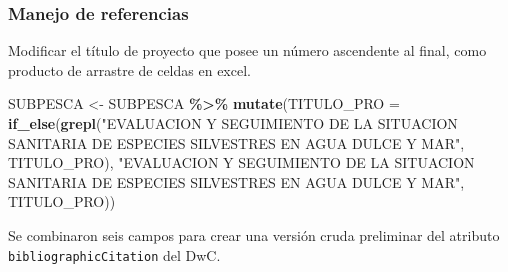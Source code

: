 \documentclass[sn-apa,pdflatex]{sn-jnl}
\newenvironment{Shaded}{\begin{snugshade}}{\end{snugshade}}
\newcommand{\AttributeTok}[1]{\textcolor[rgb]{0.13,0.29,0.53}{#1}}
\newcommand{\FunctionTok}[1]{\textcolor[rgb]{0.13,0.29,0.53}{\textbf{#1}}}
\newcommand{\NormalTok}[1]{#1}
\newcommand{\OtherTok}[1]{\textcolor[rgb]{0.56,0.35,0.01}{#1}}
\newcommand{\SpecialCharTok}[1]{\textcolor[rgb]{0.81,0.36,0.00}{\textbf{#1}}}
\newcommand{\StringTok}[1]{\textcolor[rgb]{0.31,0.60,0.02}{#1}}
\begin{document}
\subsubsection{Manejo de referencias}\label{manejo-de-referencias}

Modificar el título de proyecto que posee un número ascendente al final,
como producto de arrastre de celdas en excel.

\begin{Shaded}
\begin{Highlighting}[]
\NormalTok{SUBPESCA }\OtherTok{\textless{}{-}}\NormalTok{ SUBPESCA }\SpecialCharTok{\%\textgreater{}\%}
    \FunctionTok{mutate}\NormalTok{(}\AttributeTok{TITULO\_PRO =} \FunctionTok{if\_else}\NormalTok{(}\FunctionTok{grepl}\NormalTok{(}\StringTok{"EVALUACION Y SEGUIMIENTO DE LA SITUACION SANITARIA DE ESPECIES SILVESTRES EN AGUA DULCE Y MAR"}\NormalTok{,}
\NormalTok{        TITULO\_PRO), }\StringTok{"EVALUACION Y SEGUIMIENTO DE LA SITUACION SANITARIA DE ESPECIES SILVESTRES EN AGUA DULCE Y MAR"}\NormalTok{,}
\NormalTok{        TITULO\_PRO))}
\end{Highlighting}
\end{Shaded}

Se combinaron seis campos para crear una versión cruda preliminar del
atributo \texttt{bibliographicCitation} del DwC.
\end{document}

